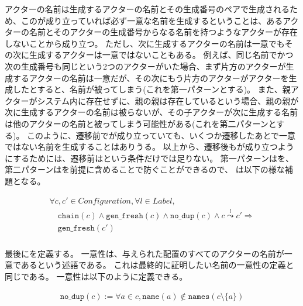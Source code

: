 アクターの名前は生成するアクターの名前とその生成番号のペアで生成されるため、この\fresh が成り立っていれば必ず一意な名前を生成するということは、あるアクターの名前とそのアクターの生成番号からなる名前を持つようなアクターが存在しないことから成り立つ。
ただし、次に生成するアクターの名前は一意でもその次に生成するアクターは一意ではないこともある。
例えば、同じ名前でかつ次の生成番号も同じという2つのアクターがいた場合、まず片方のアクターが生成するアクターの名前は一意だが、その次にもう片方のアクターがアクターを生成したとすると、名前が被ってしまう(これを第一パターンとする)。
また、親アクターがシステム内に存在せずに、親の親は存在しているという場合、親の親が次に生成するアクターの名前は被らないが、その子アクターが次に生成する名前は他のアクターの名前と被ってしまう可能性がある(これを第二パターンとする)。
このように、遷移前で\fresh が成り立っていても、いくつか遷移したあとで一意ではない名前を生成することはありうる。
以上から、遷移後も\fresh が成り立つようにするためには、遷移前は\fresh という条件だけでは足りない。
第一パターンは\nodup を、第二パターンは\chain を前提に含めることで防ぐことができるので、
\freshpreserv は以下の様な補題となる。

\begin{lemma}{\freshpreserv}
\begin{displaymath}
  \begin{array}{l}
    \forall c, c' \in \textit{Configuration}, \forall l \in \textit{Label}, \\
    \quad \texttt{chain}(c) \wedge \texttt{gen\_fresh}(c) \wedge \texttt{no\_dup}(c) \wedge c \overset{l}{\leadsto} c' \Rightarrow \\
    \quad \texttt{gen\_fresh}(c')
  \end{array}
\end{displaymath}
\end{lemma}

\subsubsection{\nodup}

最後に\nodup を定義する。
一意性は、与えられた配置のすべてのアクターの名前が一意であるという述語である。
これは最終的に証明したい名前の一意性の定義と同じである。
一意性は以下のように定義できる。

\begin{definition}{\nodup}
\begin{displaymath}
  \begin{array}{l}
    \texttt{no\_dup}(c) :=
    \forall a \in c, \texttt{name}(a) \notin
    \texttt{names}(c \setminus \{a\})
  \end{array}
\end{displaymath}
\end{definition}

